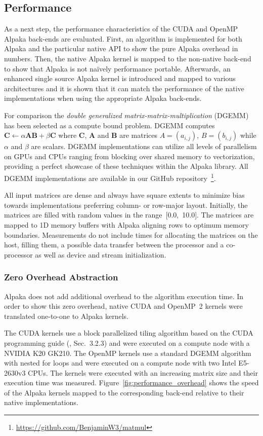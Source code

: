 \documentclass[10pt, twocolumn]{article}
\newcommand{\alpaka}{Alpaka\xspace}
\newcommand{\cuda}{{CUDA}\xspace}
\newcommand{\openmp}{{OpenMP}\xspace}
\newcommand{\nvidia}{{NVIDIA}\xspace}
\newcommand{\intel}{{Intel}\xspace}
\newcommand{\github}{{GitHub}\xspace}
\begin{document}
\subsection{Performance}
As a next step, the performance characteristics of the \cuda and \openmp \alpaka back-ends are evaluated.
First, an algorithm is implemented for both \alpaka and the particular native API to show the pure \alpaka overhead in numbers.
Then, the native \alpaka kernel is mapped to the non-native back-end to show that \alpaka is not na\"{i}vely performance portable.
Afterwards, an enhanced  single source \alpaka kernel is introduced and mapped to various architectures and it is shown that it can match the performance of the native implementations when using the appropriate \alpaka back-ends.

For comparison the \emph{double generalized matrix-matrix-multiplication} (DGEMM) has been selected as a compute bound problem.
DGEMM computes $\boldsymbol{C} \leftarrow \alpha \boldsymbol{A} \boldsymbol{B} + \beta \boldsymbol{C}$ where $\boldsymbol{C}$, $\boldsymbol{A}$ and $\boldsymbol{B}$ are matrices $A = (a_{i,j})$, $B = (b_{i,j})$ while $\alpha$ and $\beta$ are scalars.
DGEMM implementations can utilize all levels of parallelism on GPUs and CPUs ranging from blocking over shared memory to vectorization, providing a perfect showcase of these techniques within the \alpaka library.
All DGEMM implementations are available in our \github repository~\footnote{\url{https://github.com/BenjaminW3/matmul}}.

All input matrices are dense and always have square extents to minimize bias towards implementations preferring column- or row-major layout.
Initially, the matrices are filled with random values in the range~[0.0,~10.0].
The matrices are mapped to 1D memory buffers with \alpaka aligning rows to optimum memory boundaries.
Measurements do not include times for allocating the matrices on the host, filling them, a possible data transfer between the processor and a co-processor as well as device and stream initialization.

\hfill
\subsubsection{Zero Overhead Abstraction}
\alpaka does not add additional overhead to the algorithm execution time.
In order to show this zero overhead, native \cuda and \openmp~2 kernels were translated one-to-one to \alpaka kernels.

The \cuda kernels use a block parallelized tiling algorithm based on the \cuda programming guide (\cite{CUDAPG}, Sec.~3.2.3) and were executed on a compute node with a \nvidia K20 GK210.
The \openmp kernels use a standard DGEMM algorithm with nested for loops and were executed on a compute node with two \intel E5-2630v3 CPUs.
The kernels were executed with an increasing matrix size and their execution time was measured.
Figure~\ref{fig:performance_overhead} shows the speed of the \alpaka kernels mapped to the corresponding back-end relative to their native implementations.
\end{document}
